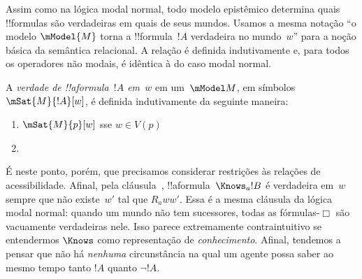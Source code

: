 \documentclass[../../../include/open-logic-section]{subfiles}
\begin{document}


Assim como na lógica modal normal, todo modelo epistêmico determina quais !!{formula}s são verdadeiras em
quais de seus mundos. Usamos a mesma notação ``o modelo $\mModel{M}$ torna a
!!{formula}~$!A$ verdadeira no mundo~$w$'' para a noção básica da semântica
relacional. A relação é definida indutivamente e, para todos os operadores não modais, é idêntica à do caso modal normal.

\begin{defn}
  A \emph{verdade de !!a{formula}~$!A$ em~$w$} em um~$\mModel M$, em símbolos
  $\mSat{M}{!A}[w]$, é definida indutivamente da seguinte maneira:
  \begin{enumerate}
  \item $\mSat{M}{p}[w]$ sse $w \in V(p)$
  \item{}
  \end{enumerate} 
\end{defn}

É neste ponto, porém, que precisamos considerar restrições às relações
de acessibilidade. Afinal, pela cláusula~,
!!a{formula}~$\Knows_a !B$ é verdadeira em~$w$ sempre que não existe~$w'$
tal que $R_a ww'$. Essa é a mesma cláusula da lógica modal normal: quando
um mundo não tem sucessores, todas as fórmulas-$\Box$ são vacuamente
verdadeiras nele. Isso parece extremamente contraintuitivo se
entendermos $\Knows$ como representação de \emph{conhecimento}. Afinal,
tendemos a pensar que não há \emph{nenhuma} circunstância na qual um
agente possa saber ao mesmo tempo tanto $!A$ quanto $\lnot !A$.
\end{document}
